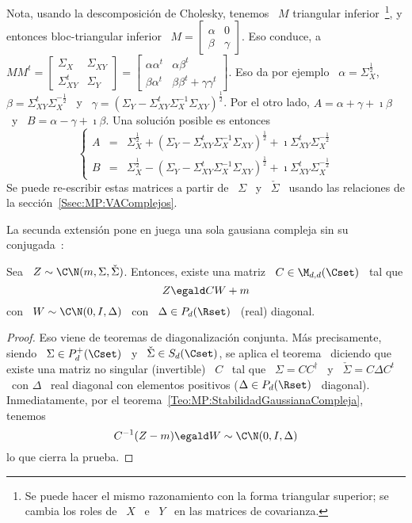 %
Nota,  usando  la  descomposici\'on   de  Cholesky,  tenemos  \  $M$  triangular
inferior~\footnote{Se puede hacer el  mismo razonamiento con la forma triangular
  superior;  se cambia  los roles  de \  $X$  \ e  \ $Y$  \ en  las matrices  de
  covarianza.},  y  entonces bloc-triangular  inferior  \  $M =  \begin{bmatrix}
  \alpha  &  0  \\  \beta  &  \gamma \end{bmatrix}$.   Eso  conduce,  a  $M  M^t
= \begin{bmatrix} \Sigma_X & \Sigma_{XY} \\ \Sigma_{XY}^t &
  \Sigma_Y \end{bmatrix}  = \begin{bmatrix} \alpha \alpha^t &  \alpha \beta^t \\
  \beta \alpha^t &  \beta \beta^t + \gamma \gamma^t  \end{bmatrix}$.  Eso da por
ejemplo \   $\alpha    =   \Sigma_X^{\frac12}$,    \    $\beta   =    \Sigma_{XY}^t
\Sigma_X^{-\frac12}$ \ y \ $\gamma = \left( \Sigma_Y - \Sigma_{XY}^t \Sigma_X^{-1}
  \Sigma_{XY} \right)^{\frac12}$.   Por el otro lado,  $A = \alpha  + \gamma +
\imath \beta$ \ y \ $B = \alpha - \gamma + \imath \beta$. Una soluci\'on posible
es entonces
%
\[
\left\{\begin{array}{lll}
A & = & \Sigma_X^{\frac12} + \left( \Sigma_Y - \Sigma_{XY}^t \Sigma_X^{-1} \Sigma_{XY}
\right)^{\frac12}  + \imath \Sigma_{XY}^t
\Sigma_X^{-\frac12}\\[2.5mm]
%
B & = &  \Sigma_X^{\frac12} - \left( \Sigma_Y - \Sigma_{XY}^t \Sigma_X^{-1} \Sigma_{XY}
\right)^{\frac12} + \imath \Sigma_{XY}^t
\Sigma_X^{-\frac12}
\end{array}\right.
\]
%
Se  puede   re-escribir  estas  matrices   a  partir  de   \  $\Sigma$  \   y  \
$\check{\Sigma}$       \      usando       las       relaciones      de       la
secci\'on~\ref{Ssec:MP:VAComplejos}.

La  secunda  extensi\'on  pone  en  juega  una sola  gausiana  compleja  sin  su
conjugada~\cite{EriKoi06, SchSch03}:
%
\begin{teorema}
\label{Teo:MP:GausianaComplejaWIDiago}
%
  Sea \ $Z \sim \C\N(m,\Sigma,\check{\Sigma})$. Entonces, existe una matriz \ $C
  \in \M_{d,d}(\Cset)$ \ tal que
  \[
  Z \egald C W + m
  \]
  con \ $W \sim \C\N(0,I,\Delta)$ \ con \ $\Delta \in P_d(\Rset)$ \ (real) diagonal.
\end{teorema}
\begin{proof}
  Eso  viene  de teoremas  de  diagonalizaci\'on  conjunta. M\'as  precisamente,
  siendo \ $\Sigma  \in P_d^+(\Cset)$ \ y \  $\check{\Sigma} \in S_d(\Cset)$, se
  aplica el  teorema~\cite[Teo.~7.6.5]{HorJoh13} diciendo que  existe una matriz
  no  singular (invertible)  \  $C$ \  tal  que \  $\Sigma  = C  C^\dag$  \ y  \
  $\check{\Sigma} = C  \Delta C^t$ \ con $\Delta$ \  real diagonal con elementos
  positivos  ($\Delta  \in  P_d(\Rset)$  \  diagonal).  Inmediatamente,  por  el
  teorema~\ref{Teo:MP:StabilidadGaussianaCompleja}, tenemos
  \[
  C^{-1} (Z - m) \egald W \sim \C\N(0,I,\Delta)
  \]
  lo que cierra la prueba.
\end{proof}


